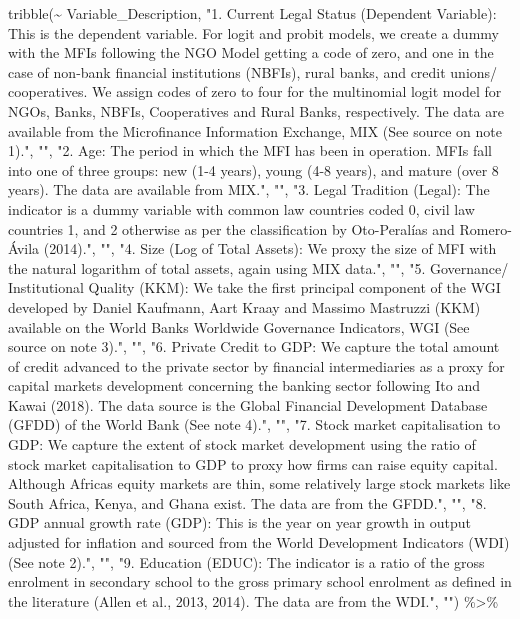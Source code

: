 \documentclass[a4paper,nobind]{templates/ociamthesis}
\newenvironment{Shaded}{\begin{snugshade}}{\end{snugshade}}
\newcommand{\FunctionTok}[1]{\textcolor[rgb]{0.00,0.00,0.00}{#1}}
\newcommand{\NormalTok}[1]{#1}
\newcommand{\SpecialCharTok}[1]{\textcolor[rgb]{0.00,0.00,0.00}{#1}}
\newcommand{\StringTok}[1]{\textcolor[rgb]{0.31,0.60,0.02}{#1}}
\renewenvironment{Shaded}
{
  \vspace{10pt}%
  \begin{snugshade}%
}{%
  \end{snugshade}%
  \vspace{8pt}%
}
\begin{document}
\begin{Shaded}
\begin{Highlighting}[]
\FunctionTok{tribble}\NormalTok{(}\SpecialCharTok{\textasciitilde{}}\NormalTok{ Variable\_Description, }\StringTok{"1. Current Legal Status (Dependent Variable): This is the dependent variable. For logit and probit models, we create a dummy with the MFIs following the NGO Model getting a code of zero, and one in the case of non{-}bank financial institutions (NBFIs), rural banks, and credit unions/ cooperatives. We assign codes of zero to four for the multinomial logit model for NGOs, Banks, NBFIs, Cooperatives and Rural Banks, respectively. The data are available from the Microfinance Information Exchange, MIX (See source on note 1)."}\NormalTok{, }\StringTok{""}\NormalTok{, }\StringTok{"2.  Age: The period in which the MFI has been in operation. MFIs fall into one of three groups: new (1{-}4 years), young (4{-}8 years), and mature (over 8 years). The data are available from MIX."}\NormalTok{, }\StringTok{""}\NormalTok{, }\StringTok{"3. Legal Tradition (Legal): The indicator is a dummy variable with common law countries coded 0, civil law countries 1, and 2 otherwise as per the classification by Oto{-}Peralías and Romero{-}Ávila (2014)."}\NormalTok{, }\StringTok{""}\NormalTok{, }\StringTok{"4. Size (Log of Total Assets): We proxy the size of MFI with the natural logarithm of total assets, again using MIX data."}\NormalTok{, }\StringTok{""}\NormalTok{, }\StringTok{"5. Governance/ Institutional Quality (KKM): We take the first principal component of the WGI developed by Daniel Kaufmann, Aart Kraay and Massimo Mastruzzi (KKM) available on the World Bank\textquotesingle{}s Worldwide Governance Indicators, WGI (See source on note 3)."}\NormalTok{, }\StringTok{""}\NormalTok{, }\StringTok{"6. Private Credit to GDP: We capture the total amount of credit advanced to the private sector by financial intermediaries as a proxy for capital markets development concerning the banking sector following Ito and Kawai (2018). The data source is the Global Financial Development Database (GFDD) of the World Bank (See note 4)."}\NormalTok{, }\StringTok{""}\NormalTok{, }\StringTok{"7. Stock market capitalisation to GDP: We capture the  extent of stock market development using the ratio of stock market capitalisation to GDP to proxy how firms can raise equity capital. Although Africa\textquotesingle{}s equity markets are thin, some relatively large stock markets like South Africa, Kenya, and Ghana exist. The data are from the GFDD."}\NormalTok{, }\StringTok{""}\NormalTok{, }\StringTok{"8. GDP annual growth rate (GDP): This is the year on year growth in output adjusted for inflation and sourced from the World Development Indicators (WDI) (See note 2)."}\NormalTok{, }\StringTok{""}\NormalTok{, }\StringTok{"9. Education (EDUC): The indicator is a ratio of the gross enrolment in secondary school to the gross primary school enrolment as defined in the literature (Allen et al., 2013, 2014). The data are from the WDI."}\NormalTok{, }\StringTok{""}\NormalTok{) }\SpecialCharTok{\%\textgreater{}\%} 
  

\end{Highlighting}
\end{Shaded}
\end{document}
